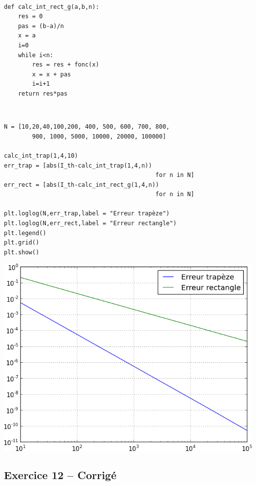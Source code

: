\documentclass[10pt,fleqn]{article} %
\begin{document}
\begin{corrige}
$\quad$
\begin{lstlisting}    
def calc_int_rect_g(a,b,n):
    res = 0
    pas = (b-a)/n
    x = a
    i=0
    while i<n:
        res = res + fonc(x)
        x = x + pas
        i=i+1
    return res*pas
\end{lstlisting}
\end{corrige}


\begin{corrige}
$\quad$
\begin{lstlisting}
N = [10,20,40,100,200, 400, 500, 600, 700, 800, 
        900, 1000, 5000, 10000, 20000, 100000]

calc_int_trap(1,4,10)
err_trap = [abs(I_th-calc_int_trap(1,4,n)) 
                                           for n in N]
err_rect = [abs(I_th-calc_int_rect_g(1,4,n)) 
                                           for n in N]

plt.loglog(N,err_trap,label = "Erreur trapèze")
plt.loglog(N,err_rect,label = "Erreur rectangle")
plt.legend()
plt.grid()
plt.show()

\end{lstlisting}
\end{corrige}

\begin{center}
\includegraphics[width=.4\linewidth]{images/exo_FB_11}
\end{center}



\subsection*{Exercice 12 -- Corrigé}
\end{document}
